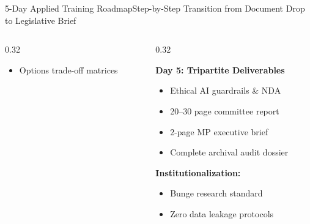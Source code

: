 \documentclass[aspectratio=169, 10pt]{beamer}
\begin{document}
\begin{frame}{5-Day Applied Training Roadmap}{Step-by-Step Transition from Document Drop to Legislative Brief}
\begin{columns}[t]
\begin{column}{0.32\textwidth}
\begin{tcolorbox}[colback=lightgrey, colframe=suagreen, arc=1.2mm, boxrule=0.7pt, title=\textbf{Days 3 \& 4: Empirical \& Policy}]
\begin{itemize}
          \item Options trade-off matrices
        \end{itemize}
      \end{tcolorbox}
    \end{column}
    \begin{column}{0.32\textwidth}
      \begin{tcolorbox}[colback=lightgrey, colframe=darkcharcoal, arc=1.2mm, boxrule=0.7pt, title=\textbf{Day 5: Synthesis \& Ethics}]
        \scriptsize
        \textbf{\textcolor{darkcharcoal}{Day 5: Tripartite Deliverables}}
        \begin{itemize}
          \item Ethical AI guardrails \& NDA
          \item 20--30 page committee report
          \item 2-page MP executive brief
          \item Complete archival audit dossier
        \end{itemize}
        \vspace{2pt}
        \textbf{\textcolor{suagreen}{Institutionalization:}}
        \begin{itemize}
          \item Bunge research standard
          \item Zero data leakage protocols
        \end{itemize}
      \end{tcolorbox}
    \end{column}
  \end{columns}
\end{frame}
\end{document}
